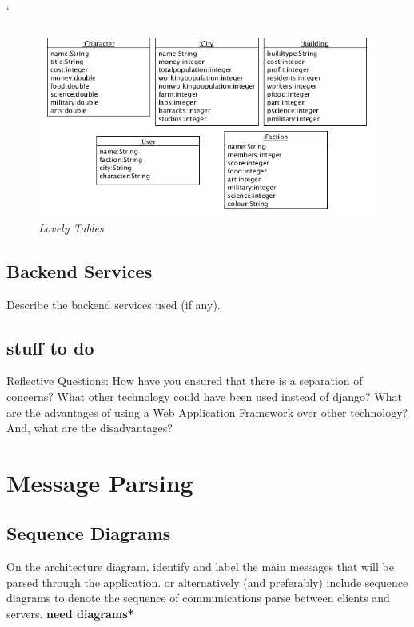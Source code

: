 `\documentclass{sig-alt-release2}
\begin{document}
\begin{figure}[!htbp]
  \caption{\textit{Lovely Tables}}
  \begin{center}
		\includegraphics[scale=0.40]{img/tables.png}
  \end{center}
\end{figure}

\subsection{Backend Services}

Describe the backend services used (if any).

\subsection{stuff to do} 

Reflective Questions: 
How have you ensured that there is a separation of concerns? 
What other technology could have been used instead of django? 
What are the advantages of using a Web Application Framework over other technology? 
And, what are the disadvantages?

\section{Message Parsing}

\subsection{Sequence Diagrams}

On the architecture diagram, identify and label the main messages that will be parsed through the application.
or alternatively (and preferably) include sequence diagrams to denote the sequence of communications parse between clients and servers. {\bf *need diagrams*} 
\end{document}
